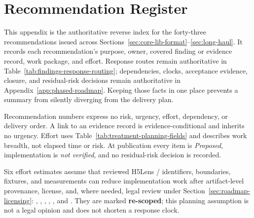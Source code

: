 \documentclass[../main.tex]{subfiles}
\begin{document}
\section{Recommendation Register}
\label{app:recommendation-register}

This appendix is the authoritative reverse index for the forty-three
recommendations issued across
Sections~\ref{sec:core-lib-format}--\ref{sec:long-haul}. It records each
recommendation's purpose, owner, covered finding or evidence record, work
package, and effort. Response routes remain authoritative in
Table~\ref{tab:findings-response-routing}; dependencies, clocks, acceptance
evidence, closure, and residual-risk decisions remain authoritative in
Appendix~\ref{app:phased-roadmap}. Keeping those facts in one place prevents a
summary from silently diverging from the delivery plan.

Recommendation numbers express no risk, urgency, effort, dependency, or
delivery order. A link to an evidence record is evidence-conditional and
inherits no urgency. Effort uses Table~\ref{tab:treatment-planning-fields} and
describes work breadth, not elapsed time or risk. At publication every item is
\emph{Proposed}, implementation is \emph{not verified}, and no residual-risk
decision is recorded.

Six effort estimates assume that reviewed H5Lens / 
identifiers, boundaries, fixtures, and measurements can reduce implementation
work after artifact-level provenance, license, and, where needed, legal review
under Section~\ref{sec:roadmap-licensing}: , ,
, , , and . They are
marked \textbf{re-scoped}; this planning assumption is not a legal opinion and
does not shorten a response clock.
\end{document}
